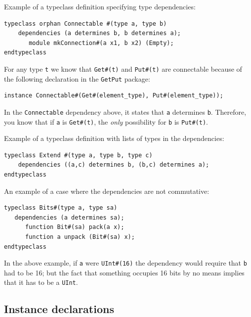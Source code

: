 \documentclass[twoside,letterpaper]{article}
\newcommand{\te}[1]{\texttt{#1}}
\begin{document}
Example of a typeclass definition specifying type dependencies:
\begin{verbatim}
typeclass orphan Connectable #(type a, type b)
    dependencies (a determines b, b determines a);
       module mkConnection#(a x1, b x2) (Empty);
endtypeclass
\end{verbatim}

For any type \texttt{t} we know that \texttt{Get\#(t)}
and \texttt{Put\#(t)} are connectable because of the following
declaration in the \te{GetPut} package: 
\begin{verbatim}
instance Connectable#(Get#(element_type), Put#(element_type));
\end{verbatim}

In the \te{Connectable} dependency above, it states that \te{a}
determines \te{b}.  Therefore, you know
that if \te{a} is \te{Get\#(t)}, the \emph{only} possibility for \te{b} is
 \te{Put\#(t)}.



Example of a typeclass definition with lists of types in the dependencies:
\begin{verbatim}
typeclass Extend #(type a, type b, type c)
    dependencies ((a,c) determines b, (b,c) determines a); 
endtypeclass
\end{verbatim}


An example of a case where the dependencies are not commutative:
\begin{verbatim}
typeclass Bits#(type a, type sa)
   dependencies (a determines sa);
      function Bit#(sa) pack(a x);
      function a unpack (Bit#(sa) x);
endtypeclass
\end{verbatim}
In the above example, if \te{a} were \te{UInt\#(16)} the dependency
would require that \te{b} had to be 16; but the fact that something
occupies 16 bits by no means implies that it has to be a \te{UInt}.



\subsection{Instance declarations}

\label{sec-instance-def}
\end{document}
